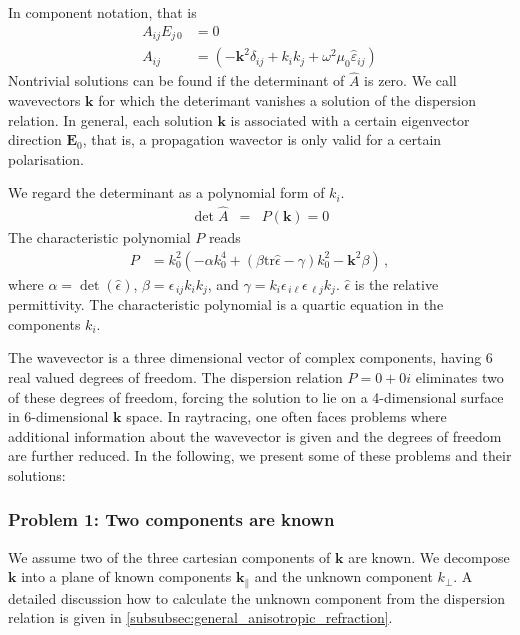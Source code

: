 \documentclass[12pt,a4paper,twoside,openright,BCOR10mm,headsepline,titlepage,abstracton,chapterprefix,final]{scrreprt}
\newcommand\Vector[1]{{\mathbf{#1}}}
\newcommand\vacuum{0}
\newcommand\wavenumber{k}
\newcommand\Wavevector{\Vector{\wavenumber}}
\newcommand\Tensor[1]{\hat{#1}}
\newcommand\scalarEfield{E}
\newcommand\Efield{\Vector{\scalarEfield}}
\newcommand\vacuumpermeability{\scalarpermeability_{\vacuum}}
\newcommand\scalarpermeability{\mu}
\newcommand\permittivity{\Tensor{\scalarpermittivity}}
\newcommand\scalarrelativepermittivity{\epsilon}
\newcommand\relativepermittivity{\Tensor{\scalarrelativepermittivity}}
\newcommand\scalarpermittivity{\varepsilon}
\newcommand\tr{\text{tr}}
\begin{document}
In component notation, that is
\begin{align}
 A_{ij} E_{j\,0} &= 0 \label{eq:generalDispersionEigenEquationindex}\\
 A_{ij}          &= \left(-\Vector{k}^2 \delta_{ij} + k_i k_j + \omega^2 \vacuumpermeability \permittivity_{ij} \right)
 \end{align}
Nontrivial solutions can be found if the determinant of $\hat{A}$ is zero.
We call wavevectors $\Wavevector$ for which the deterimant vanishes a solution of the dispersion relation.
In general, each solution $\Wavevector$ is associated with a certain eigenvector direction $\Efield_0$,
that is, a propagation wavector is only valid for a certain polarisation.

We regard the determinant as a polynomial form of $\wavenumber_i$.
\begin{eqnarray}
 \det \hat{A} &=& P(\Wavevector) = 0
\end{eqnarray}
The characteristic polynomial $P$ reads
\begin{align}
 P &= k_0^2 \left( -\alpha k_0^4 +  (\beta \tr\relativepermittivity - \gamma) k_0^2 - \Vector{k}^2 \beta \right)\,,\label{eq:dispersion_determinant_invariant}
\end{align}
where 
$\alpha = \det(\relativepermittivity)$,
$\beta = \scalarrelativepermittivity_{\,ij} k_i k_j$, 
and
$\gamma = k_i \scalarrelativepermittivity_{\,i\ell} \scalarrelativepermittivity_{\,\ell j} k_j$.
$\relativepermittivity$ is the  relative permittivity.
The characteristic polynomial is a quartic equation in the components $\wavenumber_i$.

The wavevector is a three dimensional vector of complex components, having 6 real valued degrees of freedom.
The dispersion relation $P=0+0i$ eliminates two of these degrees of freedom,
forcing the solution to lie on a 4-dimensional surface in 6-dimensional $\Wavevector$ space.
In raytracing, one often faces problems where additional information about the wavevector is given and the
degrees of freedom are further reduced. In the following, we present some of these problems and their solutions:

\subsubsection{Problem 1: Two components are known}

We assume two of the three cartesian components of $\Wavevector$ are known.
We decompose $\Wavevector$ into a plane of known components $\Wavevector_\parallel$ and the unknown component $\wavenumber_\perp$. 
A detailed discussion how to calculate the unknown component from the dispersion relation
is given in \ref{subsubsec:general_anisotropic_refraction}.
\end{document}
